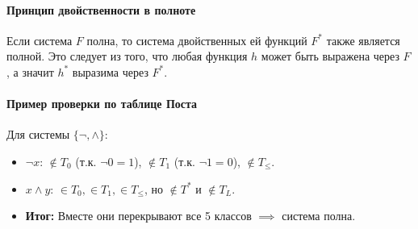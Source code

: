 \paragraph{Принцип двойственности в полноте}
Если система $F$ полна, то система двойственных ей функций $F^*$ также является полной. Это следует из того, что любая функция $h$ может быть выражена через $F$, а значит $h^*$ выразима через $F^*$.

\paragraph{Пример проверки по таблице Поста}
Для системы $\{\neg, \land\}$:
\begin{itemize}
    \item $\neg x$: $\notin T_0$ (т.к. $\neg 0=1$), $\notin T_1$ (т.к. $\neg 1=0$), $\notin T_{\le}$.
    \item $x \land y$: $\in T_0, \in T_1, \in T_{\le}$, но $\notin T^*$ и $\notin T_L$.
    \item \textbf{Итог:} Вместе они перекрывают все 5 классов $\implies$ система полна.
\end{itemize}